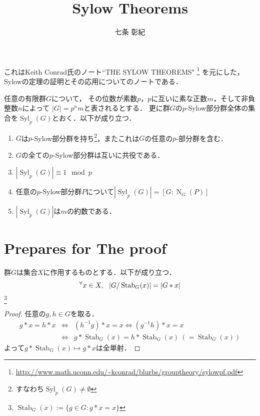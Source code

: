 \documentclass[a4paper]{jsarticle}
\title{Sylow Theorems}
\author{七条 彰紀}
\newcommand{\Stab}{\operatorname{Stab}}
\newcommand{\Norm}{\operatorname{N}}
\newcommand{\Syl}{\operatorname{Syl}}
\begin{document}
\maketitle
これはKeith Conrad氏のノート``THE SYLOW THEOREMS"
\footnote{\url{http://www.math.uconn.edu/~kconrad/blurbs/grouptheory/sylowpf.pdf}}
を元にした，Sylowの定理の証明とその応用についてのノートである．

\begin{Them}
    任意の有限群$G$について，
    その位数が素数$p$，$p$に互いに素な正数$m$，そして非負整数$n$によって
    $|G|=p^{n}m$と表されるとする．
    更に群$G$の$p$-Sylow部分群全体の集合を$\Syl_p(G)$とおく．以下が成り立つ．
    \begin{enumerate}
        \renewcommand{\labelenumi}{\Roman{enumi}.}
        \item $G$は$p$-Sylow部分群を持ち\footnote{すなわち$\Syl_p(G) \neq \emptyset$}，またこれは$G$の任意の$p$-部分群を含む．
        \item $G$の全ての$p$-Sylow部分群は互いに共役である．
        \item $|\Syl_p(G)| \equiv 1 \mod p$
        \item 任意の$p$-Sylow部分群$P$について$|\Syl_p(G)| = [G:\Norm_G(P)]$
        \item $|\Syl_p(G)|$は$m$の約数である．
    \end{enumerate}
\end{Them}

\section{Prepares for The proof}
    \begin{Them}
        群$G$は集合$X$に作用するものとする．以下が成り立つ．
        \[ \Forall{x \in  X} |G / \Stab_G(x)|=|G \ast x| \]
        \footnote{$\Stab_G(x):=\{g \in G : g \ast x=x \}$}
    \end{Them}
    \begin{proof}
        任意の$g, h \in G$を取る．
        \begin{eqnarray*}
            g \ast x=h \ast x
                &\iff& (h^{-1}g) \ast x=x \iff (g^{-1}h) \ast x=x \\
                &\iff& g \ast \Stab_G(x)= h \ast \Stab_G(x) ~(=\Stab_G(x))
        \end{eqnarray*}
        よって$g \ast \Stab_G(x) \mapsto g \ast x$は全単射．
    \end{proof}
\end{document}
